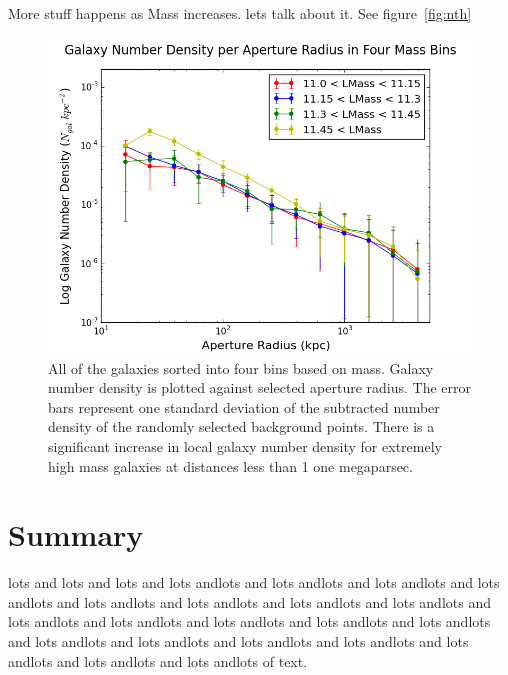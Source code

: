 \documentclass[apj]{emulateapj}
\begin{document}
More stuff happens as Mass increases. lets talk about it. See figure~\ref{fig:nth}

\begin{figure}
\centering
\graphicspath{{C:/3d_hst/2015_finals/aperture_distance/}}
\includegraphics[width=\linewidth]{temp_lmass_final}
\caption{\footnotesize All of the galaxies sorted into four bins based on mass. Galaxy number density is plotted against selected aperture radius. The error bars represent one standard deviation of the subtracted number density of the randomly selected background points. There is a significant increase in local galaxy number density for extremely high mass galaxies at distances less than 1 one megaparsec.}
\label{fig:mass}
\end{figure}

\section{Summary}

lots and lots and lots and lots andlots and lots andlots and lots andlots and lots andlots and lots andlots and lots andlots and lots andlots and lots andlots and lots andlots and lots andlots and lots andlots and lots andlots and lots andlots and lots andlots and lots andlots and lots andlots and lots andlots and lots andlots and lots andlots and lots andlots of text.


\acknowledgements

\appendix



\end{document}
